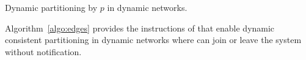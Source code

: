 \begin{algorithm}
  
  \caption{\label{algo:edges}Dynamic partitioning by \Process $p$ in dynamic networks.}
\end{algorithm}

Algorithm~\ref{algo:edges} provides the instructions of \NAME that
enable dynamic consistent partitioning in dynamic networks where
\processes can join or leave the system without
notification. 








